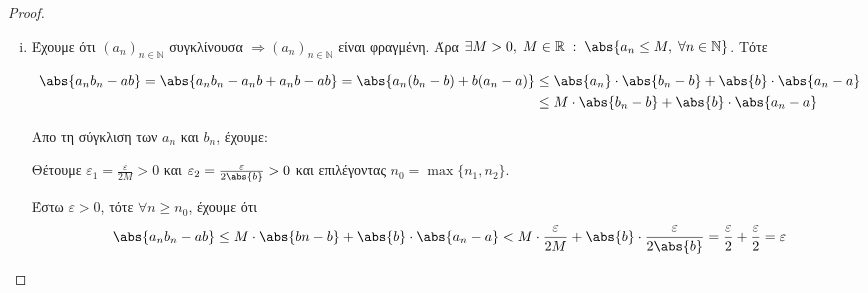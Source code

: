 \documentclass[main.tex]{subfiles}
\begin{document}
\begin{proof}
\begin{enumerate}[i)]
         \item Έχουμε ότι $ (a_{n})_{n \in \mathbb{N}} $ συγκλίνουσα $ \Rightarrow (a_{n})_{n \in
             \mathbb{N}} $ είναι φραγμένη. Άρα $ \exists M >0, \; M \in \mathbb{R} \; : \; 
             \abs{a_{n} \leq M, \; \forall n \in \mathbb{N}}$. Τότε 

             \begin{align*}
                 \abs{a_{n} b_{n} - ab} = \abs{a_{n}b_{n} - a_{n}b + a_{n}b -ab} = \abs{
                 a_{n}(b_{n}-b)+b(a_{n}-a) } &\leq \abs{a_{n}}\cdot \abs{b_{n}-b} + \abs{b} \cdot 
                 \abs{a_{n}-a} \\
                                             &\leq M \cdot  \abs{b_{n}-b} + \abs {b}\cdot 
                                             \abs{a_{n}-a}
             \end{align*}

             Απο τη σύγκλιση των $ a_{n} $ και $ b_{n} $, έχουμε:

             Θέτουμε $ \varepsilon_{1} = \frac{\varepsilon}{2M} >0 $ και $ \varepsilon_{2} =
             \frac{\varepsilon}{2\abs{b}} >0 $ και επιλέγοντας $ n_{0}= \max \{ n_{1}, n_{2}\} $.

             Έστω $ \varepsilon >0 $, τότε $ \forall n \geq n_{0}$, έχουμε ότι 
\[
    \abs{a_{n} b_{n} - ab} \leq M \cdot \abs{bn-b} + \abs{b} \cdot \abs{a_{n}- a} < 
    M \cdot \frac{\varepsilon}{2 M} + \abs {b} \cdot \frac{\varepsilon}{2 \abs{b}} =
    \frac{\varepsilon}{2} + \frac{\varepsilon}{2} = \varepsilon
 \]

\end{enumerate}
\end{proof}
\end{document}
